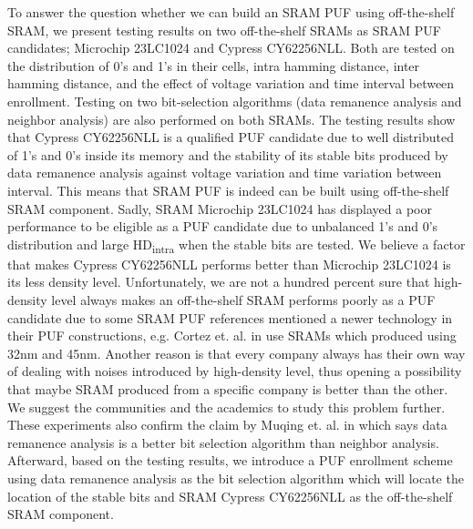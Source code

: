 To answer the question whether we can build an SRAM PUF using off-the-shelf SRAM, we present testing results on two off-the-shelf SRAMs as SRAM PUF candidates; Microchip 23LC1024 and Cypress CY62256NLL. Both are tested on the distribution of 0's and 1's in their cells, intra hamming distance, inter hamming distance, and the effect of voltage variation and time interval between enrollment. Testing on two bit-selection algorithms (data remanence analysis and neighbor analysis) are also performed on both SRAMs. The testing results show that Cypress CY62256NLL is a qualified PUF candidate due to well distributed of 1's and 0's inside its memory and the stability of its stable bits produced by data remanence analysis against voltage variation and time variation between interval. This means that SRAM PUF is indeed can be built using off-the-shelf SRAM component.
Sadly, SRAM Microchip 23LC1024 has displayed a poor performance to be eligible as a PUF candidate due to unbalanced 1's and 0's distribution and large HD\textsubscript{intra} when the stable bits are tested. We believe a factor that makes Cypress CY62256NLL performs better than Microchip 23LC1024 is its less density level. Unfortunately, we are not a hundred percent sure that high-density level always makes an off-the-shelf SRAM performs poorly as a PUF candidate due to some SRAM PUF references mentioned a newer technology in their PUF constructions, e.g. Cortez et. al. in \cite{7102498} use SRAMs which produced using 32nm and 45nm. Another reason is that every company always has their own way of dealing with noises introduced by high-density level, thus opening a possibility that maybe SRAM produced from a specific company is better than the other. We suggest the communities and the academics to study this problem further.
These experiments also confirm the claim by Muqing et. al. in \cite{liu_zhou_tang_parhi_kim_2017} which says data remanence analysis is a better bit selection algorithm than neighbor analysis.
Afterward, based on the testing results, we introduce a PUF enrollment scheme using data remanence analysis as the bit selection algorithm which will locate the location of the stable bits and SRAM Cypress CY62256NLL as the off-the-shelf SRAM component.



